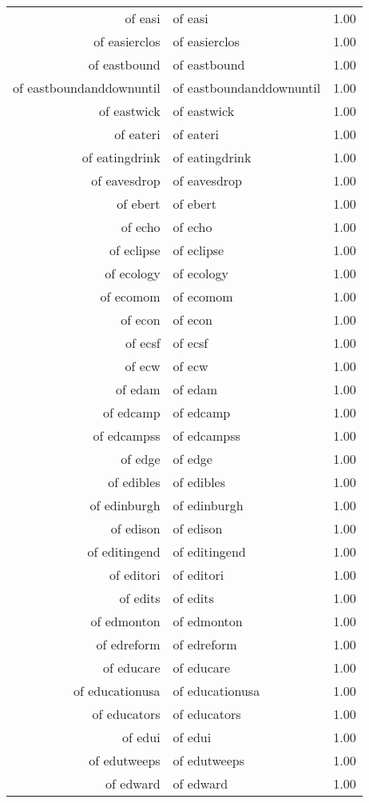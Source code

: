 \begin{table}[ht]
\begin{tabular}{rlr}
  of easi & of easi & 1.00 \\ 
  of easierclos & of easierclos & 1.00 \\ 
  of eastbound & of eastbound & 1.00 \\ 
  of eastboundanddownuntil & of eastboundanddownuntil & 1.00 \\ 
  of eastwick & of eastwick & 1.00 \\ 
  of eateri & of eateri & 1.00 \\ 
  of eatingdrink & of eatingdrink & 1.00 \\ 
  of eavesdrop & of eavesdrop & 1.00 \\ 
  of ebert & of ebert & 1.00 \\ 
  of echo & of echo & 1.00 \\ 
  of eclipse & of eclipse & 1.00 \\ 
  of ecology & of ecology & 1.00 \\ 
  of ecomom & of ecomom & 1.00 \\ 
  of econ & of econ & 1.00 \\ 
  of ecsf & of ecsf & 1.00 \\ 
  of ecw & of ecw & 1.00 \\ 
  of edam & of edam & 1.00 \\ 
  of edcamp & of edcamp & 1.00 \\ 
  of edcampss & of edcampss & 1.00 \\ 
  of edge & of edge & 1.00 \\ 
  of edibles & of edibles & 1.00 \\ 
  of edinburgh & of edinburgh & 1.00 \\ 
  of edison & of edison & 1.00 \\ 
  of editingend & of editingend & 1.00 \\ 
  of editori & of editori & 1.00 \\ 
  of edits & of edits & 1.00 \\ 
  of edmonton & of edmonton & 1.00 \\ 
  of edreform & of edreform & 1.00 \\ 
  of educare & of educare & 1.00 \\ 
  of educationusa & of educationusa & 1.00 \\ 
  of educators & of educators & 1.00 \\ 
  of edui & of edui & 1.00 \\ 
  of edutweeps & of edutweeps & 1.00 \\ 
  of edward & of edward & 1.00 \\ 

\end{tabular}
\end{table}
